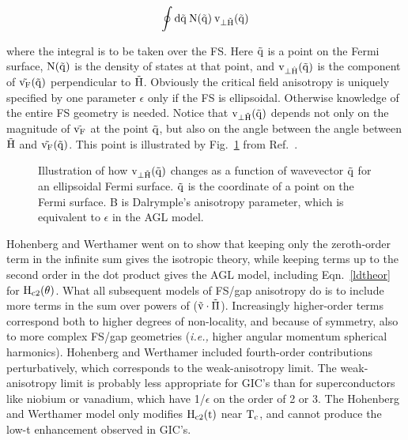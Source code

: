\[ \rm \oint d\vec{q} \:  N(\vec{q}) \: v_{\perp \vec{H}}(\vec{q})
\]

\noindent where the integral is to be taken over the FS.   Here $\rm \vec{q}$ 
is a point on the Fermi surface, $\rm N(\vec{q})$ is the  density of states
at that point,  and $\rm v_{\perp  \hat{H}} (\vec{q})$  is the component of
$\rm \vec{v_F}(\vec{q})$   perpendicular    to  $\rm \vec{H}$.  Obviously   the
critical field anisotropy is uniquely specified  by one parameter $\epsilon$
only if  the  FS  is   ellipsoidal.  Otherwise  knowledge  of the entire FS
geometry is needed.  Notice that $\rm v_{\perp  \vec{H}} (\vec{q})$ depends
not only on the magnitude of $\rm \vec{v_F}$ at the point $\rm
\vec{q}$, but also on the angle between the angle between $\rm \vec{H}$ and
$\rm  \vec{v_F}(\vec{q})$.  This point   is illustrated by Fig.~\ref{perpexplain}
from Ref.~\cite{dalrymple83}.

\begin{figure}
\vspace{8in}
\caption[Illustration of how $\rm v_{\perp  \vec{H}}  (\vec{q})$ changes as
a     function   of  $\rm      \vec{q}$   for   an     ellispsoidal   Fermi
surface.]{Illustration of how $\rm v_{\perp  \vec{H}} (\vec{q})$ changes as
a function  of wavevector $\rm \vec{q}$  for an ellipsoidal Fermi surface.
$\rm
\vec{q}$ is the coordinate of a point on the  Fermi surface.  B is Dalrymple's
anisotropy  parameter, which  is   equivalent  to $\epsilon$  in   the  AGL
model.\cite{dalrymple83}}
\label{perpexplain}
\end{figure}

        Hohenberg and Werthamer   went on to  show that  keeping  only  the
zeroth-order term  in the infinite  sum gives  the isotropic theory,  while
keeping terms  up  to the second  order in the  dot  product  gives the AGL
model,          including      Eqn.~\ref{ldtheor}           for        $\rm
H_{c2}(\theta)$.\cite{decroux82}  What   all  subsequent models of   FS/gap
anisotropy do is to  include more terms in  the   sum over powers  of ($\rm
\vec{v} \cdot
\vec{\Pi}$).  Increasingly higher-order terms correspond both to higher degrees of
non-locality,   and  because   of symmetry,  also  to  more complex  FS/gap
geometries  ({\em i.e.,\/}  higher  angular momentum  spherical harmonics).
Hohenberg   and  Werthamer         included     fourth-order  contributions
perturbatively,\cite{hohenberg67} which corresponds to  the weak-anisotropy
limit.   The weak-anisotropy limit  is probably  less appropriate for GIC's
than for superconductors like niobium  or vanadium, which have 1/$\epsilon$
on the  order of 2 or  3.  The Hohenberg  and Werthamer model only modifies
$\rm H_{c2}(t)$ near  $\rm  T_c$, and cannot  produce the low-t enhancement
observed in GIC's.

